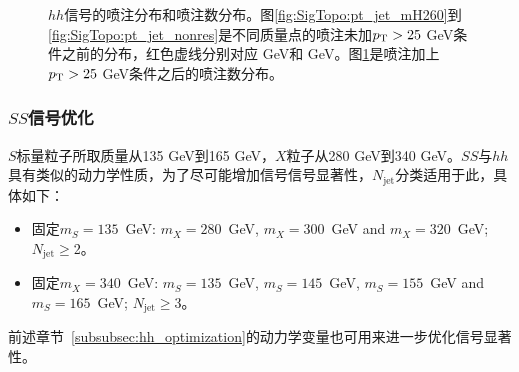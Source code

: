 \begin{figure}
\begin{subfigure}[b]{0.45\textwidth}
 \label{fig:SigTopo:numOfjet_sig}
\end{subfigure}
\caption{$hh$信号的喷注\pt 分布和喷注数分布。图\ref{fig:SigTopo:pt_jet_mH260}到\ref{fig:SigTopo:pt_jet_nonres}是不同质量点的喷注未加$p_{\text{T}}>25$ GeV条件之前的\pt 分布，红色虚线分别对应 GeV和 GeV。图\ref{fig:SigTopo:numOfjet_sig}是喷注加上$p_{\text{T}}>25$ GeV条件之后的喷注数分布。}
\label{fig:SigTopo:pt_jet}
\end{figure}

\subsubsection{$SS$信号优化}
$S$标量粒子所取质量从135 GeV到165 GeV，$X$粒子从280 GeV到340 GeV。$SS$与$hh$具有类似的动力学性质，为了尽可能增加信号信号显著性，$N_\text{jet}$分类适用于此，具体如下：
\begin{itemize}
 \item 固定$m_S=135$~GeV: $m_X=280$~GeV, $m_X=300$~GeV and $m_X=320$~GeV; $N_{\text{jet}}\geq$2。
 \item 固定$m_X=340$~GeV: $m_S=135$~GeV, $m_S=145$~GeV, $m_S=155$~GeV and $m_S=165$~GeV; $N_{\text{jet}}\geq$3。
\end{itemize}
前述章节~\ref{subsubsec:hh_optimization}的动力学变量也可用来进一步优化信号显著性。
